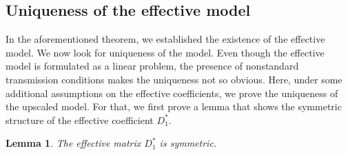 \documentclass[11pt]{article}
\newtheorem{lemma}{Lemma}
\begin{document}
\subsection{Uniqueness of the effective model}
In the aforementioned theorem, we established the existence of the effective model. We now look for uniqueness of the model. Even though the effective model is formulated as a linear problem, the presence of nonstandard transmission conditions makes the uniqueness not so obvious. Here, under some additional assumptions on the effective coefficients, we prove the uniqueness of the upscaled model.  For that, we first prove a lemma that shows the symmetric structure of the effective coefficient $D_1^*$.
\begin{lemma}\label{lemma:D1symmetric}
    The effective matrix $D_1^*$ is symmetric.
\end{lemma}
\end{document}
